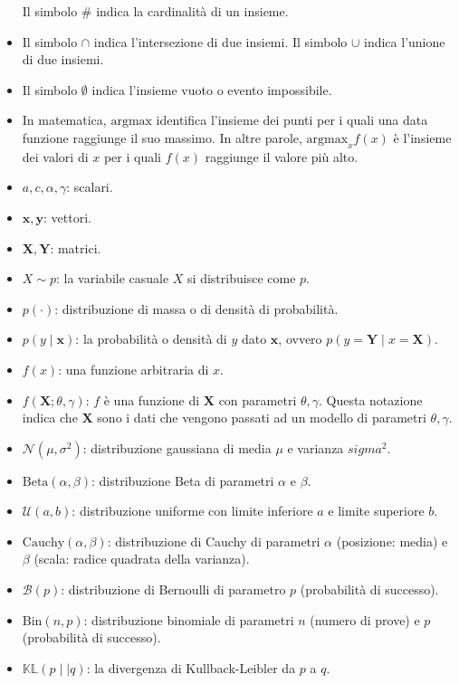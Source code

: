 \documentclass[
  11pt,
]{krantz}
\theoremstyle{definition}
\theoremstyle{definition}
\theoremstyle{definition}
\theoremstyle{definition}
\theoremstyle{remark}
\begin{document}
\begin{itemize}
  Il simbolo \(\#\) indica la cardinalità di un insieme.
\item
  Il simbolo \(\cap\) indica l'intersezione di due insiemi. Il simbolo \(\cup\) indica l'unione di due insiemi.
\item
  Il simbolo \(\emptyset\) indica l'insieme vuoto o evento impossibile.
\item
  In matematica, \(\mbox{argmax}\) identifica l'insieme dei punti per i quali una data funzione raggiunge il suo massimo. In altre parole, \(\mbox{argmax}_x f(x)\) è l'insieme dei valori di \(x\) per i quali \(f(x)\) raggiunge il valore più alto.
\item
  \(a, c, \alpha, \gamma\): scalari.
\item
  \(\boldsymbol{x}, \boldsymbol{y}\): vettori.
\item
  \(\boldsymbol{X}, \boldsymbol{Y}\): matrici.
\item
  \(X \sim p\): la variabile casuale \(X\) si distribuisce come \(p\).
\item
  \(p(\cdot)\): distribuzione di massa o di densità di probabilità.
\item
  \(p(y \mid \boldsymbol{x})\): la probabilità o densità di \(y\) dato \(\boldsymbol{x}\), ovvero \(p(y = \boldsymbol{Y} \mid x = \boldsymbol{X})\).
\item
  \(f(x)\): una funzione arbitraria di \(x\).
\item
  \(f(\boldsymbol{X}; \theta, \gamma)\): \(f\) è una funzione di \(\boldsymbol{X}\) con parametri \(\theta, \gamma\). Questa notazione indica che \(\boldsymbol{X}\) sono i dati che vengono passati ad un modello di parametri \(\theta, \gamma\).
\item
  \(\mathcal{N}(\mu, \sigma^2)\): distribuzione gaussiana di media \(\mu\) e varianza \(sigma^2\).
\item
  \(\mbox{Beta}(\alpha, \beta)\): distribuzione Beta di parametri \(\alpha\) e \(\beta\).
\item
  \(\mathcal{U}(a, b)\): distribuzione uniforme con limite inferiore \(a\) e limite superiore \(b\).
\item
  \(\mbox{Cauchy}(\alpha, \beta)\): distribuzione di Cauchy di parametri \(\alpha\) (posizione: media) e \(\beta\) (scala: radice quadrata della varianza).
\item
  \(\mathcal{B}(p)\): distribuzione di Bernoulli di parametro \(p\) (probabilità di successo).
\item
  \(\mbox{Bin}(n, p)\): distribuzione binomiale di parametri \(n\) (numero di prove) e \(p\) (probabilità di successo).
\item
  \(\mathbb{KL} (p \mid\mid q)\): la divergenza di Kullback-Leibler da \(p\) a \(q\).
\end{itemize}

  

\printindex
\end{document}
